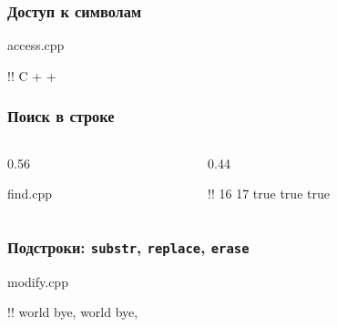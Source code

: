 \documentclass[compress, 8pt, aspectratio=169]{beamer}
\begin{document}
  \begin{frame}[fragile]

    \frametitle{Доступ к символам}

        {access.cpp}

    \begin{terminalwindow}
!!
C
+
+
    \end{terminalwindow}

  \end{frame}

  \begin{frame}[fragile]

    \frametitle{Поиск в строке}

    \begin{columns}[T]

      \begin{column}{0.56\textwidth}

            {find.cpp}

      \end{column}

      \begin{column}{0.44\textwidth}

        \begin{terminalwindow}
!!
16
17
true true true
        \end{terminalwindow}

      \end{column}

    \end{columns}

  \end{frame}

  \begin{frame}[fragile]

    \frametitle{Подстроки: \texttt{substr}, \texttt{replace}, \texttt{erase}}

        {modify.cpp}

    \begin{terminalwindow}
!!
world
bye, world
bye,
    \end{terminalwindow}

  \end{frame}
\end{document}
